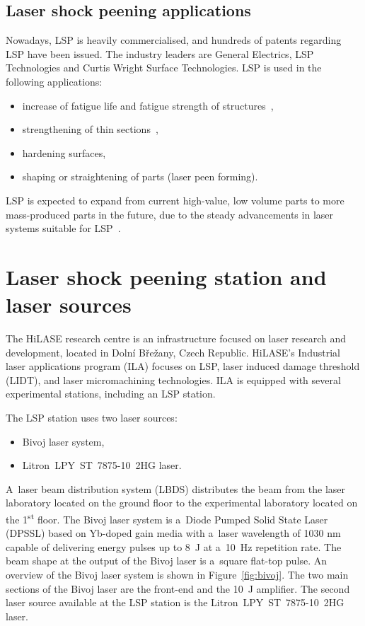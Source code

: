 \subsection{Laser shock peening applications}

Nowadays, LSP is heavily commercialised, and hundreds of patents regarding LSP have been issued. The industry leaders are General Electrics, LSP Technologies and Curtis Wright Surface Technologies. LSP is used in the following applications:

\begin{itemize}
 
    \item increase of fatigue life and fatigue strength of structures~\cite{dane_hackel_daly_harrisson_2000},
    \item strengthening of thin sections~\cite{vaccari_1992},
    \item hardening surfaces,
    \item shaping or straightening of parts  (laser peen forming).

\end{itemize}
LSP is expected to expand from current high-value, low volume parts to more \mbox{mass-produced} parts in the future, due to the steady advancements in laser systems suitable for \mbox{LSP~\cite{clauer_2019}}. 



\section{Laser shock peening station and laser sources}

The HiLASE research centre is an infrastructure focused on laser research and development, located in Dolní Břežany, Czech Republic. HiLASE's Industrial laser applications program (ILA) focuses on LSP, laser induced damage threshold (LIDT), and laser micromachining technologies. ILA is equipped with several experimental stations, including an LSP station. 

The LSP station uses two laser sources:

\begin{itemize}
  \item Bivoj laser system,
  \item Litron~LPY~ST~7875-10~2HG laser.
\end{itemize}
A~laser beam distribution system (LBDS) distributes the beam from the laser laboratory located on the ground floor to the experimental laboratory located on the 1\textsuperscript{st} floor. The Bivoj laser system is a~Diode Pumped Solid State Laser (DPSSL) based on Yb-doped gain media with a~laser wavelength of 1030 nm capable of delivering energy pulses up to \SI{8}{\joule} at a~\SI{10}{\hertz} repetition rate. The beam shape at the output of the Bivoj laser is a~square flat-top pulse. An overview of the Bivoj laser system is shown in Figure~\ref{fig:bivoj}. The two main sections of the Bivoj laser are the front-end and the \SI{10}{\joule} amplifier. The second laser source available at the LSP station is the Litron~LPY~ST~7875-10~2HG laser.
 
